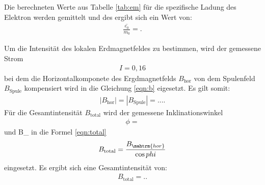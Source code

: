 Die berechneten Werte aus Tabelle \ref{tab:em}
für die spezifische Ladung des Elektron werden gemittelt
und des ergibt sich ein Wert von:
\begin{align*}
\overline{\frac{e_0}{m_0}}=.
\end{align*}


Um die Intensität des lokalen Erdmagnetfeldes
zu bestimmen, wird der gemessene Strom
\begin{align*}
I=0,16
\end{align*}
bei dem die Horizontalkomponete
des Ergdmagnetfelds $B_\mathrm{hor}$
von dem Spulenfeld $B_\mathrm{Spule} $ kompensiert wird in die
Gleichung \eqref{eqn:b} eigesetzt.
Es gilt somit:
\begin{align*}
|B_\mathrm{hor}|=|B_\mathrm{Spule}|=... .
\end{align*}
Für die Gesamtintensität $B_\mathrm{total}$
wird der gemessene Inklinationswinkel
\begin{align*}
  \phi=
\end{align*}
und B_ in die Formel \eqref{eqn:total}
\begin{align}
  B_\mathrm{total}=\frac{B_\mahtrm{hor}}{\cos{phi}}\label{eqn:total}
\end{align}
eingesetzt.
Es ergibt sich eine Gesamtintensität von:
\begin{align*}
  B_\mathrm{total}=..
\end{align*}
